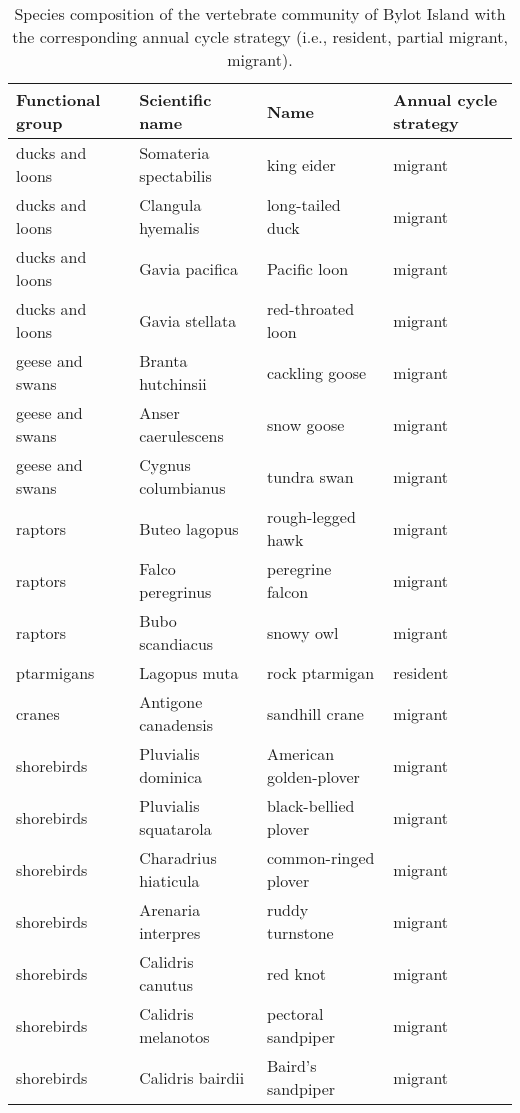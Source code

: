 \begin{table}[ht]
\centering
\caption{Species composition of the vertebrate community of Bylot Island with the corresponding annual cycle strategy (i.e., resident, partial migrant, migrant).} 
\label{table:species_name_strategy}
\begingroup\fontsize{10pt}{10pt}\selectfont
\begin{tabularx}{0.95\textwidth}{llll}
  \hline
Functional group & Scientific name & Name & Annual cycle strategy \\ 
  \hline
ducks and loons  & Somateria spectabilis & king eider & migrant \\ 
  ducks and loons  & Clangula hyemalis & long-tailed duck & migrant \\ 
  ducks and loons  & Gavia pacifica & Pacific loon & migrant \\ 
  ducks and loons  & Gavia stellata & red-throated loon & migrant \\ 
  geese and swans  & Branta hutchinsii & cackling goose & migrant \\ 
  geese and swans  & Anser caerulescens & snow goose & migrant \\ 
  geese and swans  & Cygnus columbianus & tundra swan & migrant \\ 
  raptors  & Buteo lagopus & rough-legged hawk & migrant \\ 
  raptors  & Falco peregrinus & peregrine falcon & migrant \\ 
  raptors  & Bubo scandiacus & snowy owl & migrant \\ 
  ptarmigans  & Lagopus muta & rock ptarmigan & resident \\ 
  cranes  & Antigone canadensis & sandhill crane & migrant \\ 
  shorebirds  & Pluvialis dominica & American golden-plover & migrant \\ 
  shorebirds  & Pluvialis squatarola & black-bellied plover & migrant \\ 
  shorebirds  & Charadrius hiaticula & common-ringed plover & migrant \\ 
  shorebirds  & Arenaria interpres & ruddy turnstone & migrant \\ 
  shorebirds  & Calidris canutus & red knot & migrant \\ 
  shorebirds  & Calidris melanotos & pectoral sandpiper & migrant \\ 
  shorebirds  & Calidris bairdii & Baird's sandpiper & migrant \\ 

\end{tabularx}
\end{table}
